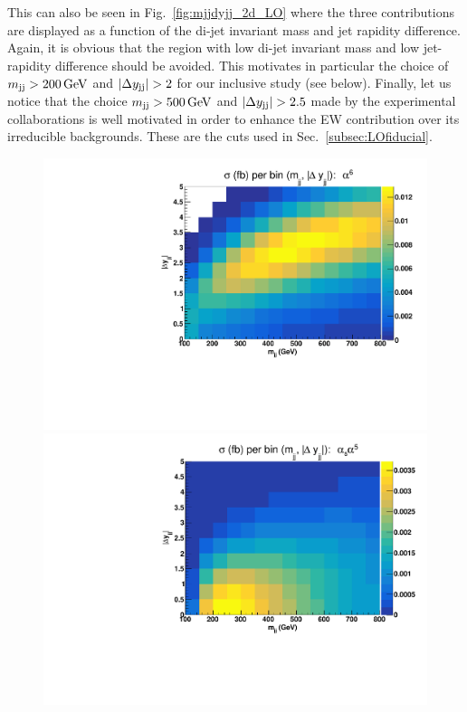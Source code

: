 This can also be seen in Fig.~\ref{fig:mjjdyjj_2d_LO} where the three contributions are displayed as a function of the di-jet invariant mass and jet rapidity difference.
Again, it is obvious that the region with low di-jet invariant mass and low jet-rapidity difference should be avoided.
This motivates in particular the choice of $m_{\text{j}\text{j}} > 200\,\text{GeV}$ and $|\Delta y_{\text{j}\text{j}}| > 2$ for our inclusive study (see below).
Finally, let us notice that the choice $m_{\text{j}\text{j}} > 500\,\text{GeV}$ and $|\Delta y_{\text{j}\text{j}}| > 2.5$ made by the experimental collaborations is well motivated in order to enhance the EW contribution over its irreducible backgrounds.
These are the cuts used in Sec.~\ref{subsec:LOfiducial}.

\begin{figure}[hbt]
\centering
\includegraphics[scale=0.395]{figures/scanfigures/scan_ew6.pdf}
\includegraphics[scale=0.395]{figures/scanfigures/scan_ew5qcd1.pdf}

\end{figure}
